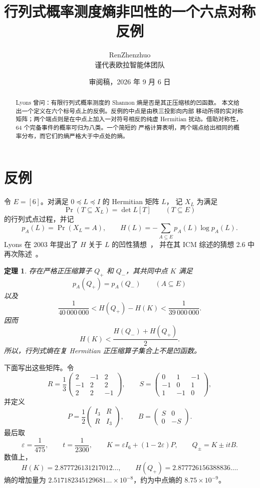\documentclass[UTF8,11pt,a4paper]{ctexart}
\title{行列式概率测度熵非凹性的一个六点对称反例}
\author{RenZhenzhuo\\\small 谨代表欧拉智能体团队}
\date{审阅稿，2026 年 9 月 6 日}
\newtheorem{theorem}{定理}
\begin{document}
\maketitle

\begin{abstract}
Lyons 曾问：有限行列式概率测度的 Shannon 熵是否是其正压缩核的凹函数。
本文给出一个定义在六个标号点上的反例。反例的中点是由秩三投影向内部
移动所得的实对称矩阵；两个端点则是在中点上加入一对符号相反的纯虚
Hermitian 扰动。借助对称性，64 个完备事件的概率可归为八类。一个简短的
严格计算表明，两个端点给出相同的概率分布，而它们的熵严格大于中点处的熵。
\end{abstract}

\section{反例}

令 $E=[6]$。对满足 $0\preceq L\preceq I$ 的 Hermitian 矩阵 $L$，
记 $X_L$ 为满足
\[
 \Pr(T\subseteq X_L)=\det L[T]\qquad(T\subseteq E)
\]
的行列式点过程，并记
\[
 p_A(L)=\Pr(X_L=A),\qquad
 H(L)=-\sum_{A\subseteq E}p_A(L)\log p_A(L).
\]
Lyons 在 2003 年提出了 $H$ 关于 $L$ 的凹性猜想~\cite{Lyons2003DPM}，
并在其 ICM 综述的猜想 2.6 中再次陈述~\cite{Lyons2014}。

\begin{theorem}\label{thm:main-zh}
存在严格正压缩算子 $Q_+$ 和 $Q_-$，其共同中点 $K$ 满足
\[
 p_A(Q_+)=p_A(Q_-)\qquad(A\subseteq E)
\]
以及
\begin{equation}\label{eq:gap-zh}
 \frac1{40\,000\,000}
 <H(Q_+)-H(K)
 <\frac1{39\,000\,000}.
\end{equation}
因而
\[
 H(K)<\frac{H(Q_-)+H(Q_+)}2.
\]
所以，行列式熵在复 Hermitian 正压缩算子集合上不是凹函数。
\end{theorem}

下面写出这些矩阵。令
\[
 R=\frac13
 \begin{pmatrix}
  2&-1& 2\\
 -1& 2& 2\\
  2& 2&-1
 \end{pmatrix},
 \qquad
 S=\begin{pmatrix}
 0&1&-1\\
 -1&0&1\\
 1&-1&0
 \end{pmatrix},
\]
并定义
\begin{equation}\label{eq:PB-zh}
 P=\frac12\begin{pmatrix}I_3&R\\ R&I_3\end{pmatrix},
 \qquad
 B=\begin{pmatrix}S&0\\0&-S\end{pmatrix}.
\end{equation}
最后取
\begin{equation}\label{eq:kernels-zh}
 \varepsilon=\frac1{475},\qquad
 t=\frac1{2300},\qquad
 K=\varepsilon I_6+(1-2\varepsilon)P,
 \qquad Q_\pm=K\pm itB.
\end{equation}
数值上，
\[
 H(K)=2.877726131217012\ldots,\qquad
 H(Q_+)=2.877726156388836\ldots.
\]
熵的增加量为
$2.517182345129681\ldots\times10^{-8}$，约为中点熵的
$8.75\times10^{-9}$。
\end{document}
